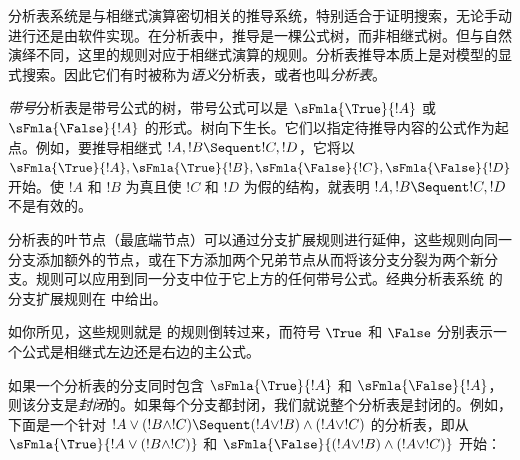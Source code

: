 \documentclass[../../../include/open-logic-section]{subfiles}
\begin{document}


分析表系统是与相继式演算密切相关的推导系统，特别适合于证明搜索，无论手动进行还是由软件实现。在分析表中，推导是一棵公式树，而非相继式树。但与自然演绎不同，这里的规则对应于相继式演算的规则。分析表推导本质上是对模型的显式搜索。因此它们有时被称为\emph{语义}分析表，或者也叫\emph{分析表}。

\emph{带号}分析表是带号公式的树，带号公式可以是 $\sFmla{\True}{!A}$ 或 $\sFmla{\False}{!A}$ 的形式。树向下生长。它们以指定待推导内容的公式作为起点。例如，要推导相继式 $!A, !B \Sequent !C, !D$，它将以 $\sFmla{\True}{!A}, \sFmla{\True}{!B},
\sFmla{\False}{!C}, \sFmla{\False}{!D}$ 开始。使 $!A$ 和 $!B$ 为真且使 $!C$ 和 $!D$ 为假的结构，就表明 $!A, !B \Sequent !C, !D$ 不是有效的。

分析表的叶节点（最底端节点）可以通过分支扩展规则进行延伸，这些规则向同一分支添加额外的节点，或在下方添加两个兄弟节点从而将该分支分裂为两个新分支。规则可以应用到同一分支中位于它上方的任何带号公式。经典分析表系统  的分支扩展规则在  中给出。



如你所见，这些规则就是  的规则倒转过来，而符号 $\True$ 和 $\False$ 分别表示一个公式是相继式左边还是右边的主公式。

如果一个分析表的分支同时包含 $\sFmla{\True}{!A}$ 和 $\sFmla{\False}{!A}$，则该分支是\emph{封闭}的。如果每个分支都封闭，我们就说整个分析表是封闭的。例如，下面是一个针对 $!A \lor (!B \land !C) \Sequent (!A \lor !B) \land
(!A \lor !C)$ 的分析表，即从 $\sFmla{\True}{!A \lor (!B \land
!C)}$ 和 $\sFmla{\False}{(!A \lor !B) \land (!A \lor !C)}$ 开始：
\end{document}
